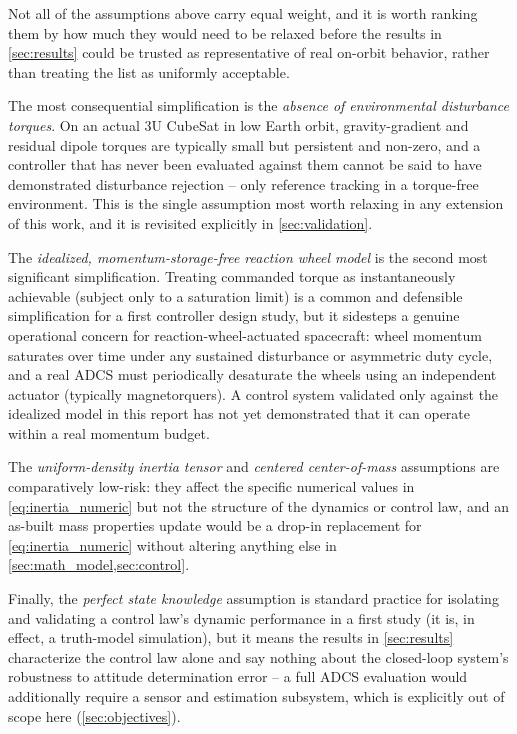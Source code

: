 Not all of the assumptions above carry equal weight, and it is worth ranking them by how much they would need to be relaxed before the results in \cref{sec:results} could be trusted as representative of real on-orbit behavior, rather than treating the list as uniformly acceptable.

The most consequential simplification is the \emph{absence of environmental disturbance torques}. On an actual 3U CubeSat in low Earth orbit, gravity-gradient and residual dipole torques are typically small but persistent and non-zero, and a controller that has never been evaluated against them cannot be said to have demonstrated disturbance rejection -- only reference tracking in a torque-free environment. This is the single assumption most worth relaxing in any extension of this work, and it is revisited explicitly in \cref{sec:validation}.

The \emph{idealized, momentum-storage-free reaction wheel model} is the second most significant simplification. Treating commanded torque as instantaneously achievable (subject only to a saturation limit) is a common and defensible simplification for a first controller design study, but it sidesteps a genuine operational concern for reaction-wheel-actuated spacecraft: wheel momentum saturates over time under any sustained disturbance or asymmetric duty cycle, and a real ADCS must periodically desaturate the wheels using an independent actuator (typically magnetorquers). A control system validated only against the idealized model in this report has not yet demonstrated that it can operate within a real momentum budget.

The \emph{uniform-density inertia tensor} and \emph{centered center-of-mass} assumptions are comparatively low-risk: they affect the specific numerical values in \cref{eq:inertia_numeric} but not the structure of the dynamics or control law, and an as-built mass properties update would be a drop-in replacement for \cref{eq:inertia_numeric} without altering anything else in \cref{sec:math_model,sec:control}.

Finally, the \emph{perfect state knowledge} assumption is standard practice for isolating and validating a control law's dynamic performance in a first study (it is, in effect, a truth-model simulation), but it means the results in \cref{sec:results} characterize the control law alone and say nothing about the closed-loop system's robustness to attitude determination error -- a full ADCS evaluation would additionally require a sensor and estimation subsystem, which is explicitly out of scope here (\cref{sec:objectives}).
